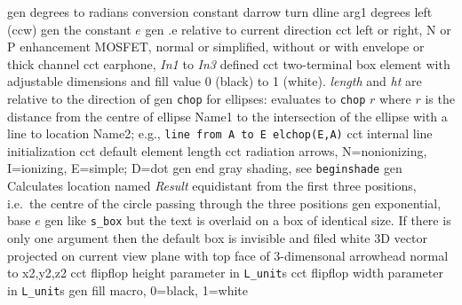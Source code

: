   {gen}
  {degrees to radians conversion constant}
  {darrow}
  {turn dline arg1 degrees left (ccw)}
  {gen}
  {the constant $e$}
  {gen}
  {.e relative to current direction}
  {cct}
  {left or right, N or P enhancement MOSFET, normal
   or simplified, without or with envelope or thick channel 
    }
  {cct}
  {earphone, {\sl In1} to {\sl In3} defined
   }
  {cct}
  { two-terminal box element with adjustable dimensions and fill
   value 0 (black) to 1 (white). {\sl length} and {\sl ht} are relative
   to the direction of \linespec{}}
  {gen}
  {{\tt chop} for ellipses: evaluates to {\tt chop} $r$ where $r$ is
    the distance from the centre of ellipse Name1 to the intersection of
    the ellipse with a line to location Name2;
    e.g., {\tt line from A to E elchop(E,A)}}
  {cct}
  {internal line initialization}
  {cct}
  {default element length}
  {cct}
  {radiation arrows, N=nonionizing, I=ionizing, E=simple;
     D=dot}
  {gen}
  {end gray shading, see {\tt beginshade}}
  {gen}
  {Calculates location named {\sl Result} equidistant from the first three
   positions, i.e.\ the centre of the circle passing through the three
   positions}
  {gen}
  {exponential, base $e$}
  {gen}
  {like {\tt s\_box} but the text is overlaid on a box of identical size.
   If there is only one argument then the default box
   is invisible and filed white
    }
  {3D}
  {vector projected on current view plane with top face
   of 3-dimensonal arrowhead normal to x2,y2,z2 }
  {cct}
  {flipflop height parameter in {\tt L\_unit}s}
  {cct}
  {flipflop width parameter in {\tt L\_unit}s}
  {gen}
  {fill macro, 0=black, 1=white}
